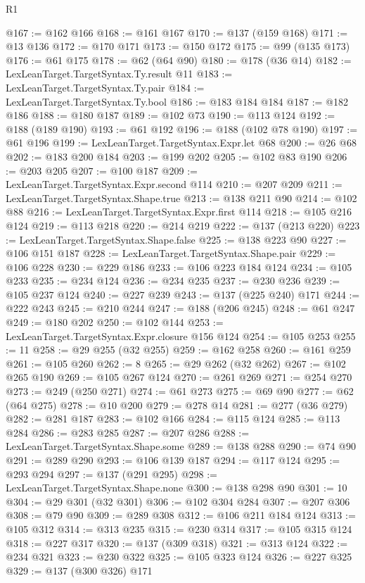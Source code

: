 \begin{lexlean}{R1}
\begin{coremodule}
{{{{{{{{{{{{{{{{{{{{{{{{{{{{{{{{{{{{{{{{{{{{{{{{{{{{{{{{{{{{{{{{{{{{{{{{{{{{{{{{{{{{{{{{{{@167 := @162 @166
@168 := @161 @167
@170 := @137 (@159 @168)
@171 := @13 @136
@172 := @170 @171
@173 := @150 @172
@175 := @99 (@135 @173)
@176 := @61 @175
@178 := @62 (@64 @90)
@180 := @178 (@36 @14)
@182 := LexLeanTarget.TargetSyntax.Ty.result @11
@183 := LexLeanTarget.TargetSyntax.Ty.pair
@184 := LexLeanTarget.TargetSyntax.Ty.bool
@186 := @183 @184 @184
@187 := @182 @186
@188 := @180 @187
@189 := @102 @73
@190 := @113 @124
@192 := @188 (@189 @190)
@193 := @61 @192
@196 := @188 (@102 @78 @190)
@197 := @61 @196
@199 := LexLeanTarget.TargetSyntax.Expr.let @68
@200 := @26 @68
@202 := @183 @200 @184
@203 := @199 @202
@205 := @102 @83 @190
@206 := @203 @205
@207 := @100 @187
@209 := LexLeanTarget.TargetSyntax.Expr.second @114
@210 := @207 @209
@211 := LexLeanTarget.TargetSyntax.Shape.true
@213 := @138 @211 @90
@214 := @102 @88
@216 := LexLeanTarget.TargetSyntax.Expr.first @114
@218 := @105 @216 @124
@219 := @113 @218
@220 := @214 @219
@222 := @137 (@213 @220)
@223 := LexLeanTarget.TargetSyntax.Shape.false
@225 := @138 @223 @90
@227 := @106 @151 @187
@228 := LexLeanTarget.TargetSyntax.Shape.pair
@229 := @106 @228
@230 := @229 @186
@233 := @106 @223 @184 @124
@234 := @105 @233
@235 := @234 @124
@236 := @234 @235
@237 := @230 @236
@239 := @105 @237 @124
@240 := @227 @239
@243 := @137 (@225 @240) @171
@244 := @222 @243
@245 := @210 @244
@247 := @188 (@206 @245)
@248 := @61 @247
@249 := @180 @202
@250 := @102 @144
@253 := LexLeanTarget.TargetSyntax.Expr.closure @156 @124
@254 := @105 @253
@255 := 11
@258 := @29 @255 (@32 @255)
@259 := @162 @258
@260 := @161 @259
@261 := @105 @260
@262 := 8
@265 := @29 @262 (@32 @262)
@267 := @102 @265 @190
@269 := @105 @267 @124
@270 := @261 @269
@271 := @254 @270
@273 := @249 (@250 @271)
@274 := @61 @273
@275 := @69 @90
@277 := @62 (@64 @275)
@278 := @10 @200
@279 := @278 @14
@281 := @277 (@36 @279)
@282 := @281 @187
@283 := @102 @166
@284 := @115 @124
@285 := @113 @284
@286 := @283 @285
@287 := @207 @286
@288 := LexLeanTarget.TargetSyntax.Shape.some
@289 := @138 @288
@290 := @74 @90
@291 := @289 @290
@293 := @106 @139 @187
@294 := @117 @124
@295 := @293 @294
@297 := @137 (@291 @295)
@298 := LexLeanTarget.TargetSyntax.Shape.none
@300 := @138 @298 @90
@301 := 10
@304 := @29 @301 (@32 @301)
@306 := @102 @304 @284
@307 := @207 @306
@308 := @79 @90
@309 := @289 @308
@312 := @106 @211 @184 @124
@313 := @105 @312
@314 := @313 @235
@315 := @230 @314
@317 := @105 @315 @124
@318 := @227 @317
@320 := @137 (@309 @318)
@321 := @313 @124
@322 := @234 @321
@323 := @230 @322
@325 := @105 @323 @124
@326 := @227 @325
@329 := @137 (@300 @326) @171
}}}}}}}}}}}}}}}}}}}}}}}}}}}}}}}}}}}}}}}}}}}}}}}}}}}}}}}}}}}}}}}}}}}}}}}}}}}}}}}}}}}}}}}}}}
\end{coremodule}
\end{lexlean}
